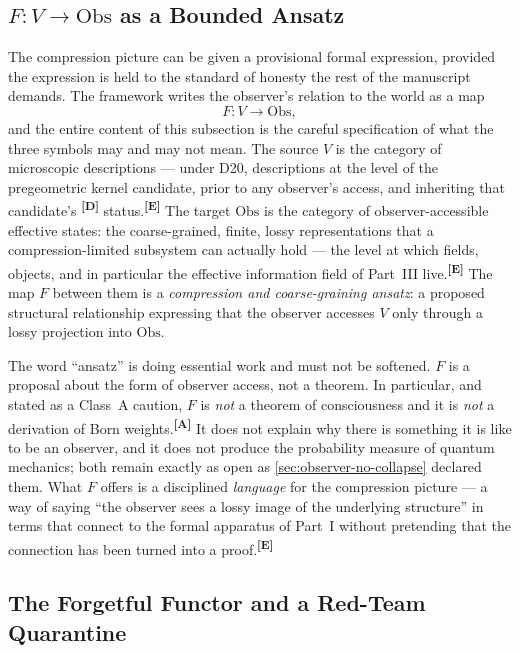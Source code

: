 \documentclass[12pt,a4paper,twoside]{article}
\theoremstyle{plain}
\theoremstyle{definition}
\theoremstyle{remark}
\newcommand{\catmark}[1]{\textsuperscript{\textsf{\textbf{[#1]}}}}
\begin{document}
\subsection{\texorpdfstring{$F\colon V \to \mathrm{Obs}$}{F: V to Obs} as a Bounded Ansatz}
\label{subsec:observer-functor-ansatz}

The compression picture can be given a provisional formal expression,
provided the expression is held to the standard of honesty the rest of
the manuscript demands. The framework writes the observer's relation to
the world as a map
\[
 F\colon V \longrightarrow \mathrm{Obs},
\]
and the entire content of this subsection is the careful specification
of what the three symbols may and may not mean. The source $V$ is the
category of microscopic descriptions --- under D20, descriptions at the
level of the pregeometric kernel candidate, prior to any observer's
access, and inheriting that candidate's \catmark{D} status.\catmark{E}
The target $\mathrm{Obs}$ is the category of observer-accessible
effective states: the coarse-grained, finite, lossy representations that
a compression-limited subsystem can actually hold --- the level at which
fields, objects, and in particular the effective information field of
Part~III live.\catmark{E} The map $F$ between them is a
\emph{compression and coarse-graining ansatz}: a proposed structural
relationship expressing that the observer accesses $V$ only through a
lossy projection into $\mathrm{Obs}$.

The word ``ansatz'' is doing essential work and must not be softened.
$F$ is a proposal about the form of observer access, not a theorem. In
particular, and stated as a Class~A caution, $F$ is \emph{not} a theorem
of consciousness and it is \emph{not} a derivation of Born
weights.\catmark{A} It does not explain why there is something it is
like to be an observer, and it does not produce the probability measure
of quantum mechanics; both remain exactly as open as
\cref{sec:observer-no-collapse} declared them. What $F$ offers is a
disciplined \emph{language} for the compression picture --- a way of
saying ``the observer sees a lossy image of the underlying structure''
in terms that connect to the formal apparatus of Part~I without
pretending that the connection has been turned into a proof.\catmark{E}

\subsection{The Forgetful Functor and a Red-Team Quarantine}
\label{subsec:forgetful-functor}
\end{document}
